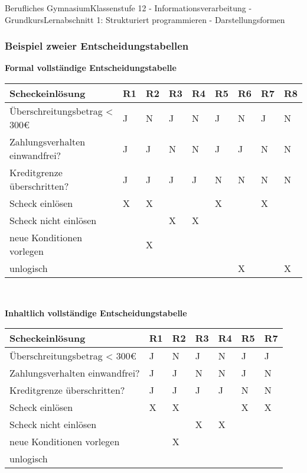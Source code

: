 \documentclass[11pt,oneside,openany,headings=optiontotoc,11pt,numbers=noenddot]{article}
\begin{document}
\begin{worksheet}{Berufliches Gymnasium}{Klassenstufe 12 - Informationsverarbeitung - Grundkurs}{Lernabschnitt 1: Strukturiert programmieren - Darstellungsformen}
		\subsubsection*{Beispiel zweier Entscheidungstabellen}
		\textbf{Formal vollständige Entscheidungstabelle}\\
		\begin{tabularx}{\textwidth}{|l||M|M|M|M|M|M|M|M|}
			\hline
			\textbf{Scheckeinlösung} & \textbf{R1} & \textbf{R2} & \textbf{R3} & \textbf{R4} & \textbf{R5} & \textbf{R6} & \textbf{R7} & \textbf{R8}\\
			\hline
			Überschreitungsbetrag < 300\euro & J & N & J & N & J & N & J & N\\
			\hline
			Zahlungsverhalten einwandfrei? & J & J & N & N & J & J & N & N\\
			\hline
			Kreditgrenze überschritten? & J & J & J & J & N & N & N & N\\
			\hline
			\hline
			Scheck einlösen & X & X & & & X & & X & \\
			\hline
			Scheck nicht einlösen & & & X & X & & & & \\
			\hline
			neue Konditionen vorlegen & & X & & & & & & \\
			\hline
			unlogisch & & & & & & X & & X \\
			\hline
		\end{tabularx}\\
		\par\noindent
		\textbf{Inhaltlich vollständige Entscheidungstabelle}\\
		\begin{tabularx}{\textwidth}{|l||M|M|M|M|M|M|}
			\hline
			\textbf{Scheckeinlösung} & \textbf{R1} & \textbf{R2} & \textbf{R3} & \textbf{R4} & \textbf{R5} & \textbf{R7}\\
			\hline
			Überschreitungsbetrag < 300\euro & J & N & J & N & J & J \\
			\hline
			Zahlungsverhalten einwandfrei? & J & J & N & N & J & N \\
			\hline
			Kreditgrenze überschritten? & J & J & J & J & N & N \\
			\hline
			\hline
			Scheck einlösen & X & X & & & X & X \\
			\hline
			Scheck nicht einlösen & & & X & X & & \\
			\hline
			neue Konditionen vorlegen & & X & & & & \\
			\hline
			unlogisch & & & & & & \\
			\hline
		\end{tabularx}\\

\end{worksheet}
\end{document}
